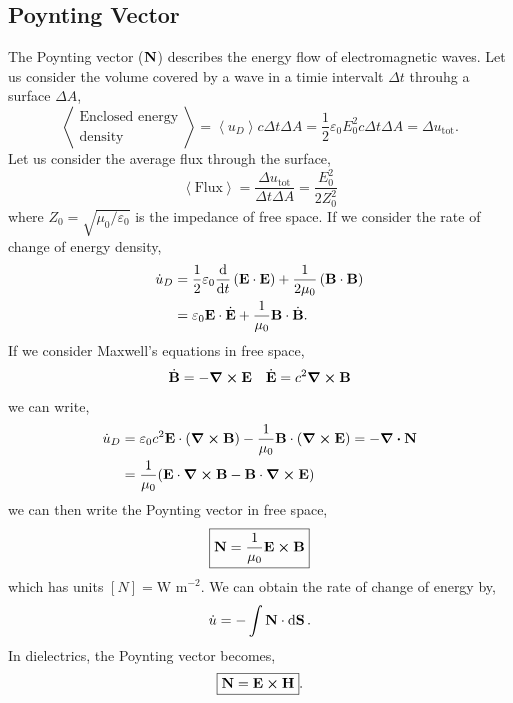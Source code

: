 \documentclass{book}
\begin{document}
\subsection{Poynting Vector}
The Poynting vector ($\vb{N}$) describes the energy flow of electromagnetic waves. Let us consider the volume covered by a wave in a timie intervalt $\Delta t$ throuhg a surface $\Delta A$,
\begin{equation}
	\left<\substack{\text{Enclosed energy}\\\text{density}}\right> = \left<u_D\right> c\Delta t \Delta A = \frac{1}{2}\varepsilon_0E_0^2c\Delta t \Delta A = \Delta u_{\text{tot}}.
\end{equation}
Let us consider the average flux through the surface,
\begin{equation}
	\left<\text{Flux}\right> = \frac{\Delta u_{\text{tot}}}{\Delta t \Delta A} = \frac{E_0^2}{2Z_0^2}
\end{equation}
where $Z_0 = \sqrt{\mu_0/\varepsilon_0}$ is the impedance of free space. If we consider the rate of change of energy density,
\begin{equation}
	\begin{split}
	\Dot{u}_D & = \frac{1}{2}\varepsilon_0\dv{t}\left(\vb{E}\cdot \vb{E}\right) + \frac{1}{2\mu_0}\left(\vb{B}\cdot\vb{B}\right) \\
	& = \varepsilon_0 \vb{E}\cdot \Dot{\vb{E}} + \frac{1}{\mu_0}\vb{B}\cdot\Dot{\vb{B}}.
	\end{split}
\end{equation}
If we consider Maxwell's equations in free space,
\begin{align}
	\Dot{\vb{B}} = - \curl{\vb{E}} && \Dot{\vb{E}} = c^2 \curl{\vb{B}}
\end{align}
we can write,
\begin{equation}
	\begin{split}
		\Dot{u}_D & = \varepsilon_0 c^2\vb{E}\cdot(\curl{\vb{B}}) - \frac{1}{\mu_0}\vb{B}\cdot(\curl{\vb{E}}) = - \div{\vb{N}} \\
		& = \frac{1}{\mu_0}(\vb{E}\cdot{\curl{\vb{B}}} - \vb{B}\cdot{\curl{\vb{E}}})
	\end{split}
\end{equation}
we can then write the Poynting vector in free space,
\begin{equation}
	\boxed{\vb{N} = \frac{1}{\mu_0}\vb{E}\cross\vb{B}}
\end{equation}
which has units $\left[N\right] = \text{W m}^{-2}$.
We can obtain the rate of change of energy by,
\begin{equation}
	\Dot{u} = - \int\vb{N}\cdot\dd{\vb{S}}.
\end{equation}
In dielectrics, the Poynting vector becomes,
\begin{equation}
	\boxed{\vb{N} = \vb{E}\cross\vb{H}}.
\end{equation}
\end{document}
